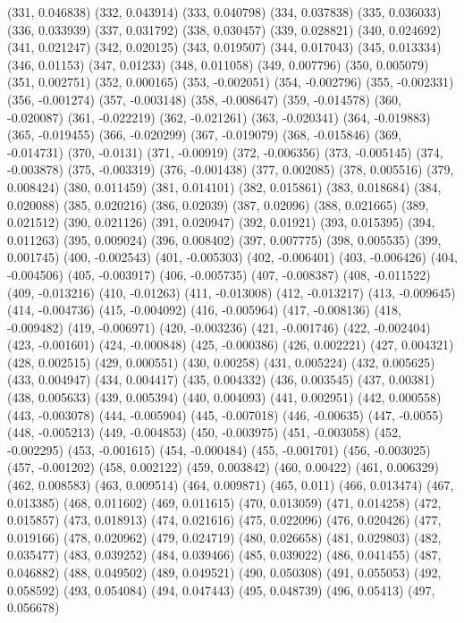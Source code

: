 (331, 0.046838)
(332, 0.043914)
(333, 0.040798)
(334, 0.037838)
(335, 0.036033)
(336, 0.033939)
(337, 0.031792)
(338, 0.030457)
(339, 0.028821)
(340, 0.024692)
(341, 0.021247)
(342, 0.020125)
(343, 0.019507)
(344, 0.017043)
(345, 0.013334)
(346, 0.01153)
(347, 0.01233)
(348, 0.011058)
(349, 0.007796)
(350, 0.005079)
(351, 0.002751)
(352, 0.000165)
(353, -0.002051)
(354, -0.002796)
(355, -0.002331)
(356, -0.001274)
(357, -0.003148)
(358, -0.008647)
(359, -0.014578)
(360, -0.020087)
(361, -0.022219)
(362, -0.021261)
(363, -0.020341)
(364, -0.019883)
(365, -0.019455)
(366, -0.020299)
(367, -0.019079)
(368, -0.015846)
(369, -0.014731)
(370, -0.0131)
(371, -0.00919)
(372, -0.006356)
(373, -0.005145)
(374, -0.003878)
(375, -0.003319)
(376, -0.001438)
(377, 0.002085)
(378, 0.005516)
(379, 0.008424)
(380, 0.011459)
(381, 0.014101)
(382, 0.015861)
(383, 0.018684)
(384, 0.020088)
(385, 0.020216)
(386, 0.02039)
(387, 0.02096)
(388, 0.021665)
(389, 0.021512)
(390, 0.021126)
(391, 0.020947)
(392, 0.01921)
(393, 0.015395)
(394, 0.011263)
(395, 0.009024)
(396, 0.008402)
(397, 0.007775)
(398, 0.005535)
(399, 0.001745)
(400, -0.002543)
(401, -0.005303)
(402, -0.006401)
(403, -0.006426)
(404, -0.004506)
(405, -0.003917)
(406, -0.005735)
(407, -0.008387)
(408, -0.011522)
(409, -0.013216)
(410, -0.01263)
(411, -0.013008)
(412, -0.013217)
(413, -0.009645)
(414, -0.004736)
(415, -0.004092)
(416, -0.005964)
(417, -0.008136)
(418, -0.009482)
(419, -0.006971)
(420, -0.003236)
(421, -0.001746)
(422, -0.002404)
(423, -0.001601)
(424, -0.000848)
(425, -0.000386)
(426, 0.002221)
(427, 0.004321)
(428, 0.002515)
(429, 0.000551)
(430, 0.00258)
(431, 0.005224)
(432, 0.005625)
(433, 0.004947)
(434, 0.004417)
(435, 0.004332)
(436, 0.003545)
(437, 0.00381)
(438, 0.005633)
(439, 0.005394)
(440, 0.004093)
(441, 0.002951)
(442, 0.000558)
(443, -0.003078)
(444, -0.005904)
(445, -0.007018)
(446, -0.00635)
(447, -0.0055)
(448, -0.005213)
(449, -0.004853)
(450, -0.003975)
(451, -0.003058)
(452, -0.002295)
(453, -0.001615)
(454, -0.000484)
(455, -0.001701)
(456, -0.003025)
(457, -0.001202)
(458, 0.002122)
(459, 0.003842)
(460, 0.00422)
(461, 0.006329)
(462, 0.008583)
(463, 0.009514)
(464, 0.009871)
(465, 0.011)
(466, 0.013474)
(467, 0.013385)
(468, 0.011602)
(469, 0.011615)
(470, 0.013059)
(471, 0.014258)
(472, 0.015857)
(473, 0.018913)
(474, 0.021616)
(475, 0.022096)
(476, 0.020426)
(477, 0.019166)
(478, 0.020962)
(479, 0.024719)
(480, 0.026658)
(481, 0.029803)
(482, 0.035477)
(483, 0.039252)
(484, 0.039466)
(485, 0.039022)
(486, 0.041455)
(487, 0.046882)
(488, 0.049502)
(489, 0.049521)
(490, 0.050308)
(491, 0.055053)
(492, 0.058592)
(493, 0.054084)
(494, 0.047443)
(495, 0.048739)
(496, 0.05413)
(497, 0.056678)